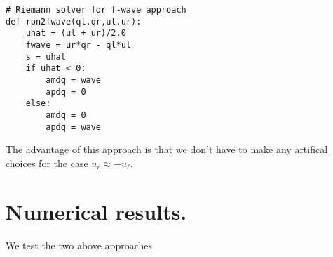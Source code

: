 \documentclass{article}
\begin{document}
\vspace{0.25cm}

\begin{minipage}{\textwidth}
\begin{verbatim}
# Riemann solver for f-wave approach
def rpn2fwave(ql,qr,ul,ur):
    uhat = (ul + ur)/2.0
    fwave = ur*qr - ql*ul
    s = uhat
    if uhat < 0:
        amdq = wave
        apdq = 0
    else:
        amdq = 0
        apdq = wave
\end{verbatim}
\end{minipage}

\vspace{0.25cm}

\noindent
The advantage of this approach is that we don't have to make any artifical choices for the case $u_r \approx -u_\ell$.  

\section{Numerical results.}  We test the two above approaches





\end{document}
